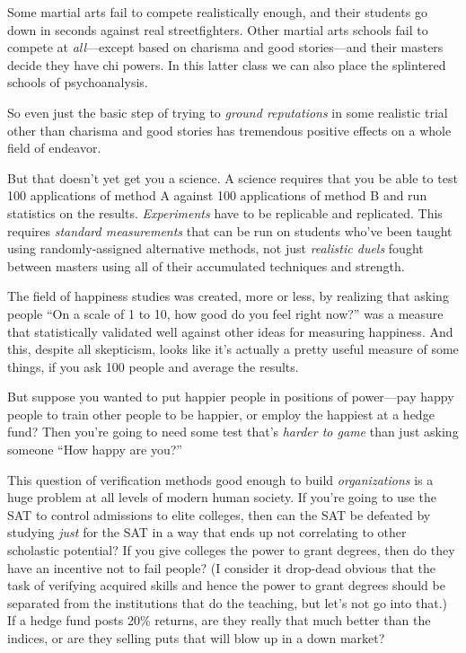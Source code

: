 {
 Some martial arts fail to compete realistically enough, and their
students go down in seconds against real streetfighters. Other martial
arts schools fail to compete at \textit{all}{}---except based on
charisma and good stories---and their masters decide they have chi
powers. In this latter class we can also place the splintered schools
of psychoanalysis.}

{
 So even just the basic step of trying to \textit{ground
reputations} in some realistic trial other than charisma and good
stories has tremendous positive effects on a whole field of endeavor.}

{
 But that doesn't yet get you a science. A science
requires that you be able to test 100 applications of method A against
100 applications of method B and run statistics on the results.
\textit{Experiments} have to be replicable and replicated. This
requires \textit{standard measurements} that can be run on students
who've been taught using randomly-assigned alternative
methods, not just \textit{realistic duels} fought between masters using
all of their accumulated techniques and strength.}

{
 The field of happiness studies was created, more or less, by
realizing that asking people ``On a scale of 1 to 10,
how good do you feel right now?'' was a measure that
statistically validated well against other ideas for measuring
happiness. And this, despite all skepticism, looks like
it's actually a pretty useful measure of some things,
if you ask 100 people and average the results.}

{
 But suppose you wanted to put happier people in positions of
power---pay happy people to train other people to be happier, or employ
the happiest at a hedge fund? Then you're going to need
some test that's \textit{harder to game} than just
asking someone ``How happy are
you?''}

{
 This question of verification methods good enough to build
\textit{organizations} is a huge problem at all levels of modern human
society. If you're going to use the SAT to control
admissions to elite colleges, then can the SAT be defeated by studying
\textit{just} for the SAT in a way that ends up not correlating to
other scholastic potential? If you give colleges the power to grant
degrees, then do they have an incentive not to fail people? (I consider
it drop-dead obvious that the task of verifying acquired skills and
hence the power to grant degrees should be separated from the
institutions that do the teaching, but let's not go
into that.) If a hedge fund posts 20\% returns, are they really that
much better than the indices, or are they selling puts that will blow
up in a down market?}

